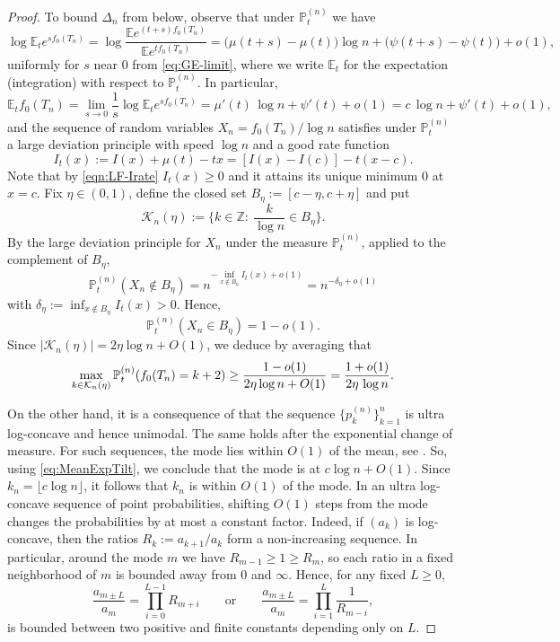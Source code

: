 \documentclass[11pt,a4paper]{article}
\numberwithin{equation}{section}
\def\EE{\mathbb{E}}
\def\PP{\mathbb{P}}
\begin{document}
\begin{proof}
	To bound $\Delta_n$ from below, observe that under $\PP_t^{(n)}$ we have 
	\[
	\log \EE_t e^{s f_0(T_n)}
	=\log \frac{\EE e^{(t+s)f_0(T_n)}}{\EE e^{t f_0(T_n)}}
	=\big(\mu(t+s)-\mu(t)\big)\log n+\big(\psi(t+s)-\psi(t)\big)+o(1),
	\]
	uniformly for $s$ near $0$ from \eqref{eq:GE-limit}, where we write $\EE_t$ for the expectation (integration) with respect to $\PP_t^{(n)}$. In particular,
	\begin{equation}\label{eq:MeanExpTilt}
        \EE_t f_0(T_n) = \lim_{s\to 0} \frac{1}{s} \log \EE_t e^{s f_0(T_n)}=\mu'(t)\,\log n+\psi'(t)+o(1)=c\,\log n+\psi'(t)+o(1),
	\end{equation}
	and the sequence of random variables $X_n=f_0(T_n)/\log n$ satisfies under $\PP_t^{(n)}$ a large deviation principle with speed $\log n$ and a good rate function
	\[
	I_t(x):=I(x)+\mu(t)-t x = [I(x)-I(c)]-t(x-c).
	\]
	Note that by \eqref{eqn:LF-Irate} $I_t(x)\geq 0$ and it attains its unique minimum $0$ at $x=c$. Fix $\eta\in(0,1)$, define the closed set $B_\eta:=[c-\eta,c+\eta]$ and put
	\[
	\mathcal K_n(\eta):=\Big\{k\in\mathbb Z:\ \frac{k}{\log n}\in B_\eta\Big\}.
	\]
	By the large deviation principle for $X_n$ under the measure $\PP_t^{(n)}$, applied to the complement of $B_\eta$,
	\[
	\PP_t^{(n)}(X_n\notin B_\eta)
	= n^{-\inf_{x\notin B_\eta} I_t(x)+o(1)}
	= n^{-\delta_\eta+o(1)}
	\]
	with $\delta_\eta:=\inf_{x\notin B_\eta} I_t(x)>0$. Hence,
	\[
	\PP_t^{(n)}(X_n\in B_\eta)=1-o(1).
	\]
	Since $|\mathcal K_n(\eta)|=2\eta\log n+O(1)$, we deduce by averaging that
	\begin{equation}\label{eq:ZwischenschrittMax}
	\max_{k\in\mathcal K_n(\eta)} \PP_t^{(n)}(f_0(T_n)=k+2)
	\geq \frac{1-o(1)}{2\eta\log n+O(1)} = {1+o(1)\over 2\eta\,\log n}.
	\end{equation}

	On the other hand, it is a consequence of \cite[Theorem 6]{GT:2021} 
	that the sequence $\{p_k^{(n)}\}_{k=1}^n$ is ultra log-concave and hence unimodal. The same holds after the exponential change of measure.
	For such sequences, the mode lies within $O(1)$ of the mean, see \cite[page 123--124]{Stanley}. So, using \eqref{eq:MeanExpTilt},
	we conclude that the mode is at $c\log n+O(1)$. Since $k_n=\lfloor c\log n\rfloor$, it follows that $k_n$ is within
	$O(1)$ of the mode. In an ultra log-concave sequence of point probabilities, shifting
	$O(1)$ steps from the mode changes the probabilities by at most
	a constant factor. Indeed, if 
	$(a_k)$ is log-concave, then the ratios $R_k:=a_{k+1}/a_k$ form a 
	non-increasing sequence. In particular, around the mode $m$ we have 
	$R_{m-1}\ge 1 \ge R_m$, so each ratio in a fixed neighborhood of $m$ 
	is bounded away from $0$ and $\infty$. Hence, for any fixed $L\ge 0$,
	\[
	\frac{a_{m\pm L}}{a_m} =\prod_{i=0}^{L-1} R_{m+i}
	\qquad\text{or}\qquad 
	\frac{a_{m\pm L}}{a_m} = \prod_{i=1}^{L} \frac{1}{R_{m-i}},
	\]
	is bounded between two positive and finite constants depending only on $L$.
	

\end{proof}
\end{document}
